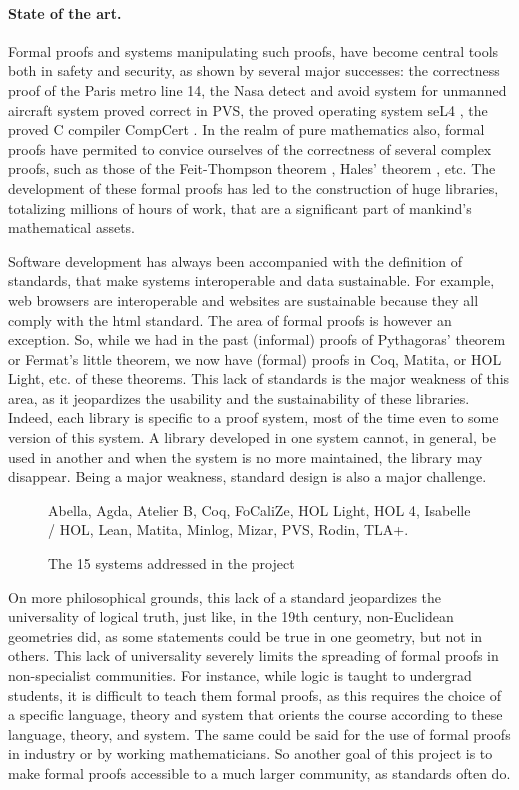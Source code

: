 \paragraph{State of the art.}
Formal proofs and systems manipulating such proofs, have become
central tools both in safety and security, as shown by several major
successes: the correctness proof of the Paris metro line 14, the Nasa
detect and avoid system for unmanned aircraft system proved correct in
PVS, the proved operating system seL4 \cite{Klein09}, the proved C
compiler CompCert \cite{Leroy06}.  In the realm of pure mathematics
also, formal proofs have permited to convice ourselves of the
correctness of several complex proofs, such as those of the Feit-Thompson
theorem \cite{Gonthier13}, Hales' theorem
\cite{Hales17}, etc.  The development of these formal proofs has led
to the construction of huge libraries, totalizing millions of hours of
work, that are a significant part of mankind's mathematical assets.

Software development has always been accompanied with the definition
of standards, that make systems interoperable and data
sustainable. For example, web browsers are interoperable and websites
are sustainable because they all comply with the html standard. The
area of formal proofs is however an exception. So, while we had in the
past (informal) proofs of Pythagoras' theorem or Fermat's little
theorem, we now have (formal) proofs in {\sc Coq}, {\sc Matita}, or
{\sc HOL Light}, etc. of these theorems. This lack of standards is
the major weakness of this area, as it jeopardizes the usability and
the sustainability of these libraries. Indeed, each library is
specific to a proof system, most of the time even to some version of
this system. A library developed in one system cannot, in general, be
used in another and when the system is no more maintained, the library
may disappear. Being a major weakness, standard design is also a major
challenge.

\begin{figure}
{\sc Abella}, 
{\sc Agda}, 
{\sc Atelier B}, 
{\sc Coq}, 
{\sc FoCaliZe}, 
{\sc HOL Light}, 
{\sc HOL 4},
{\sc Isabelle / HOL},
{\sc Lean}, 
{\sc Matita}, 
{\sc Minlog}, 
{\sc Mizar}, 
{\sc PVS}, 
{\sc Rodin}, 
{\sc TLA+}.
\caption{The 15 systems addressed in the project}
\end{figure}

On more philosophical grounds, this lack of a standard jeopardizes the
universality of logical truth, just like, in the 19th century,
non-Euclidean geometries did, as some statements could be true in one
geometry, but not in others.  This lack of universality severely
limits the spreading of formal proofs in non-specialist
communities. For instance, while logic is taught to undergrad
students, it is difficult to teach them formal proofs, as this
requires the choice of a specific language, theory and system that
orients the course according to these language, theory, and
system. The same could be said for the use of formal proofs in
industry or by working mathematicians. So another goal of this project
is to make formal proofs accessible to a much larger community, as
standards often do.

